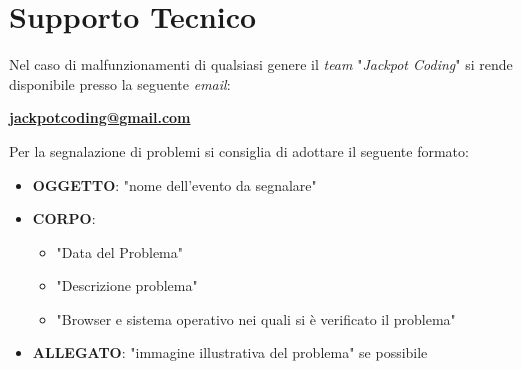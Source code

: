 \documentclass[5pt]{article}
\begin{document}
        
	\section{Supporto Tecnico}
		Nel caso di malfunzionamenti di qualsiasi genere il \textit{team} "\textit{Jackpot Coding}" si rende disponibile presso la seguente \textit{email}:
		\begin{center}
			\textbf{\url{jackpotcoding@gmail.com}}
		\end{center}

		Per la segnalazione di problemi si consiglia di adottare il seguente formato:
		\begin{itemize}
			\item \textbf{OGGETTO}: "nome dell'evento da segnalare"
			\item \textbf{CORPO}:
			\begin{itemize}
				\item "Data del Problema"
				\item "Descrizione problema"
				\item "Browser e sistema operativo nei quali si è verificato il problema"
			\end{itemize}
			\item \textbf{ALLEGATO}: "immagine illustrativa del problema" se possibile
		\end{itemize}
        
\end{document}
